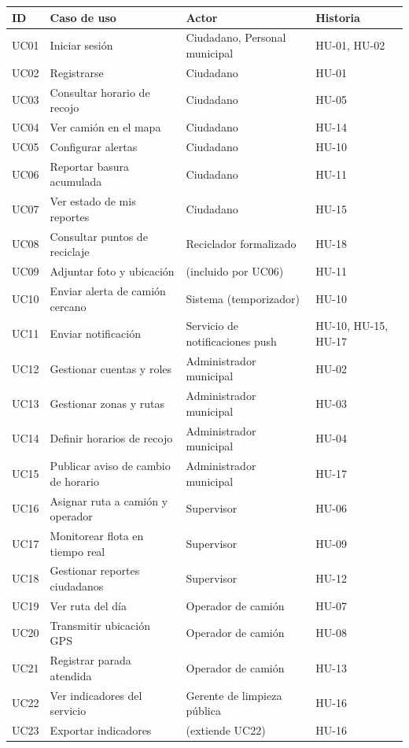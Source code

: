 \documentclass[11pt,a4paper]{article}
\begin{document}
{\small
\begin{longtable}{C{1.2cm} L{6.2cm} L{5.2cm} L{2.6cm}}
\toprule
\textbf{ID} & \textbf{Caso de uso} & \textbf{Actor} & \textbf{Historia} \\
\midrule
\endhead
UC01 & Iniciar sesión & Ciudadano, Personal municipal & HU-01, HU-02 \\
UC02 & Registrarse & Ciudadano & HU-01 \\
UC03 & Consultar horario de recojo & Ciudadano & HU-05 \\
UC04 & Ver camión en el mapa & Ciudadano & HU-14 \\
UC05 & Configurar alertas & Ciudadano & HU-10 \\
UC06 & Reportar basura acumulada & Ciudadano & HU-11 \\
UC07 & Ver estado de mis reportes & Ciudadano & HU-15 \\
UC08 & Consultar puntos de reciclaje & Reciclador formalizado & HU-18 \\
UC09 & Adjuntar foto y ubicación & (incluido por UC06) & HU-11 \\
UC10 & Enviar alerta de camión cercano & Sistema (temporizador) & HU-10 \\
UC11 & Enviar notificación & Servicio de notificaciones push & HU-10, HU-15, HU-17 \\
UC12 & Gestionar cuentas y roles & Administrador municipal & HU-02 \\
UC13 & Gestionar zonas y rutas & Administrador municipal & HU-03 \\
UC14 & Definir horarios de recojo & Administrador municipal & HU-04 \\
UC15 & Publicar aviso de cambio de horario & Administrador municipal & HU-17 \\
UC16 & Asignar ruta a camión y operador & Supervisor & HU-06 \\
UC17 & Monitorear flota en tiempo real & Supervisor & HU-09 \\
UC18 & Gestionar reportes ciudadanos & Supervisor & HU-12 \\
UC19 & Ver ruta del día & Operador de camión & HU-07 \\
UC20 & Transmitir ubicación GPS & Operador de camión & HU-08 \\
UC21 & Registrar parada atendida & Operador de camión & HU-13 \\
UC22 & Ver indicadores del servicio & Gerente de limpieza pública & HU-16 \\
UC23 & Exportar indicadores & (extiende UC22) & HU-16 \\
\bottomrule
\end{longtable}
}
\end{document}
